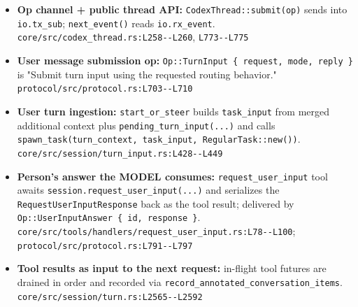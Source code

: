 \begin{itemize}
\item \textbf{Op channel + public thread API:} \texttt{CodexThread:\allowbreak{}:\allowbreak{}submit(\allowbreak{}op)} sends into \texttt{io.\allowbreak{}tx\_\allowbreak{}sub}; \texttt{next\_\allowbreak{}event(\allowbreak{})} reads \texttt{io.\allowbreak{}rx\_\allowbreak{}event}. \texttt{core/\allowbreak{}src/\allowbreak{}codex\_\allowbreak{}thread.\allowbreak{}rs:\allowbreak{}L258-\allowbreak{}-\allowbreak{}L260}, \texttt{L773-\allowbreak{}-\allowbreak{}L775}
\item \textbf{User message submission op:} \texttt{Op:\allowbreak{}:\allowbreak{}TurnInput \{ request, mode, reply \}} is "Submit turn input using the requested routing behavior." \texttt{protocol/\allowbreak{}src/\allowbreak{}protocol.\allowbreak{}rs:\allowbreak{}L703-\allowbreak{}-\allowbreak{}L710}
\item \textbf{User turn ingestion:} \texttt{start\_\allowbreak{}or\_\allowbreak{}steer} builds \texttt{task\_\allowbreak{}input} from merged additional context plus \texttt{pending\_\allowbreak{}turn\_\allowbreak{}input(\allowbreak{}.\allowbreak{}.\allowbreak{}.\allowbreak{})} and calls \texttt{spawn\_\allowbreak{}task(\allowbreak{}turn\_\allowbreak{}context, task\_\allowbreak{}input, RegularTask:\allowbreak{}:\allowbreak{}new(\allowbreak{}))}. \texttt{core/\allowbreak{}src/\allowbreak{}session/\allowbreak{}turn\_\allowbreak{}input.\allowbreak{}rs:\allowbreak{}L428-\allowbreak{}-\allowbreak{}L449}
\item \textbf{Person's answer the MODEL consumes:} \texttt{request\_\allowbreak{}user\_\allowbreak{}input} tool awaits \texttt{session.\allowbreak{}request\_\allowbreak{}user\_\allowbreak{}input(\allowbreak{}.\allowbreak{}.\allowbreak{}.\allowbreak{})} and serializes the \texttt{RequestUserInputResponse} back as the tool result; delivered by \texttt{Op:\allowbreak{}:\allowbreak{}UserInputAnswer \{ id, response \}}. \texttt{core/\allowbreak{}src/\allowbreak{}tools/\allowbreak{}handlers/\allowbreak{}request\_\allowbreak{}user\_\allowbreak{}input.\allowbreak{}rs:\allowbreak{}L78-\allowbreak{}-\allowbreak{}L100}; \texttt{protocol/\allowbreak{}src/\allowbreak{}protocol.\allowbreak{}rs:\allowbreak{}L791-\allowbreak{}-\allowbreak{}L797}
\item \textbf{Tool results as input to the next request:} in-flight tool futures are drained in order and recorded via \texttt{record\_\allowbreak{}annotated\_\allowbreak{}conversation\_\allowbreak{}items}. \texttt{core/\allowbreak{}src/\allowbreak{}session/\allowbreak{}turn.\allowbreak{}rs:\allowbreak{}L2565-\allowbreak{}-\allowbreak{}L2592}

\end{itemize}
